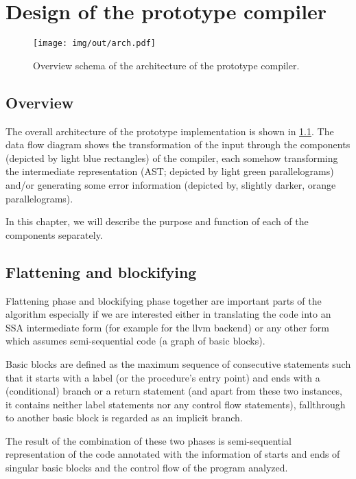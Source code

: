 \chapter{Design of the prototype compiler}

\label{chap3}

\begin{figure}
    \texttt{[image: img/out/arch.pdf]}
\caption{Overview schema of the architecture of the prototype compiler.}
\label{fig:arch}
\end{figure}

\section{Overview}

The overall architecture of the prototype implementation is shown in \cref{fig:arch}. The data flow diagram shows the transformation of the input through the components (depicted by light blue rectangles) of the compiler, each somehow transforming the intermediate representation (AST; depicted by light green parallelograms) and/or generating some error information (depicted by, slightly darker, orange parallelograms).

In this chapter, we will describe the purpose and function of each of the components separately.

\section{Flattening and blockifying}

Flattening phase and blockifying phase together are important parts of the algorithm especially if we are interested either in translating the code into an SSA intermediate form (for example for the llvm backend) or any other form which assumes semi-sequential code (a graph of basic blocks).

Basic blocks are defined as the maximum sequence of consecutive statements such that it starts with a label (or the procedure's entry point) and ends with a (conditional) branch or a return statement (and apart from these two instances, it contains neither label statements nor any control flow statements), fallthrough to another basic block is regarded as an implicit branch.

The result of the combination of these two phases is semi-sequential representation of the code annotated with the information of starts and ends of singular basic blocks and the control flow of the program analyzed.

